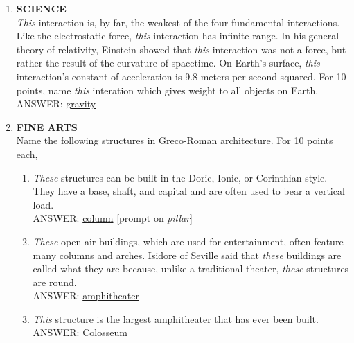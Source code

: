 \documentclass{report}
\newcommand*{\backtrack}{\setcounter{enumi}{\numexpr\theenumi-1\relax}}
\begin{document}
\begin{enumerate}
    \item \textbf{SCIENCE} \\ \textit{This} interaction is, by far, the weakest of the four fundamental interactions. Like the electrostatic force, \textit{this} interaction has infinite range. In his general theory of relativity, Einstein showed that \textit{this} interaction was not a force, but rather the result of the curvature of spacetime. On Earth's surface, \textit{this} interaction's constant of acceleration is 9.8 meters per second squared. For 10 points, name \textit{this} interation which gives weight to all objects on Earth. \\ ANSWER: \underline{gravity} \backtrack
    \item \textbf{FINE ARTS} \\ Name the following structures in Greco-Roman architecture. For 10 points each,
    \begin{enumerate}[label=\Alph*]
        \item \textit{These} structures can be built in the Doric, Ionic, or Corinthian style. They have a base, shaft, and capital and are often used to bear a vertical load. \\ ANSWER: \underline{column} [prompt on \textit{pillar}]
        \item \textit{These} open-air buildings, which are used for entertainment, often feature many columns and arches. Isidore of Seville said that \textit{these} buildings are called what they are because, unlike a traditional theater, \textit{these} structures are round. \\ ANSWER: \underline{amphitheater}
        \item \textit{This} structure is the largest amphitheater that has ever been built. \\ ANSWER: \underline{Colosseum}
    \end{enumerate}


\end{enumerate}
\end{document}
